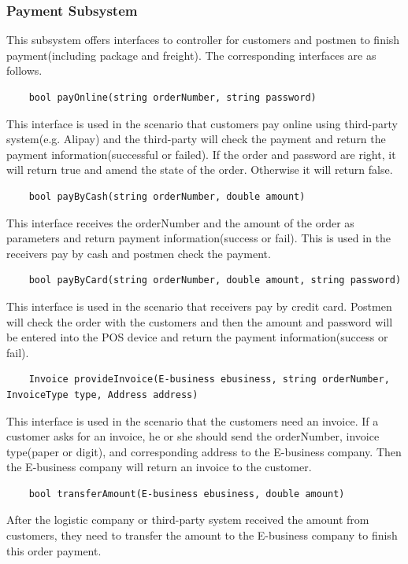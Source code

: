 \documentclass[12pt]{scrreprt}
\begin{document}
\subsubsection{Payment Subsystem}
This subsystem offers interfaces to controller for customers and postmen to finish payment(including package and freight). The corresponding interfaces are as follows.
\begin{lstlisting}
	bool payOnline(string orderNumber, string password)
\end{lstlisting}
This interface is used in the scenario that customers pay online using third-party system(e.g. Alipay) and the third-party will check the payment and return the payment information(successful or failed). If the order and password are right, it will return true and amend the state of the order. Otherwise it will return false.
\begin{lstlisting}
	bool payByCash(string orderNumber, double amount)
\end{lstlisting}
This interface receives the orderNumber and the amount of the order as parameters and return payment information(success or fail). This is used in the receivers pay by cash and postmen check the payment.
\begin{lstlisting}
	bool payByCard(string orderNumber, double amount, string password)
\end{lstlisting}
This interface is used in the scenario that receivers pay by credit card. Postmen will check the order with the customers and then the amount and password will be entered into the POS device and return the payment information(success or fail).
\begin{lstlisting}
	Invoice provideInvoice(E-business ebusiness, string orderNumber, InvoiceType type, Address address)
\end{lstlisting}
This interface is used in the scenario that the customers need an invoice. If a customer asks for an invoice, he or she should send the orderNumber, invoice type(paper or digit), and corresponding address to the E-business company. Then the E-business company will return an invoice to the customer.
\begin{lstlisting}
	bool transferAmount(E-business ebusiness, double amount)
\end{lstlisting}
After the logistic company or third-party system received the amount from customers, they need to transfer the amount to the E-business company to finish this order payment.
\end{document}
